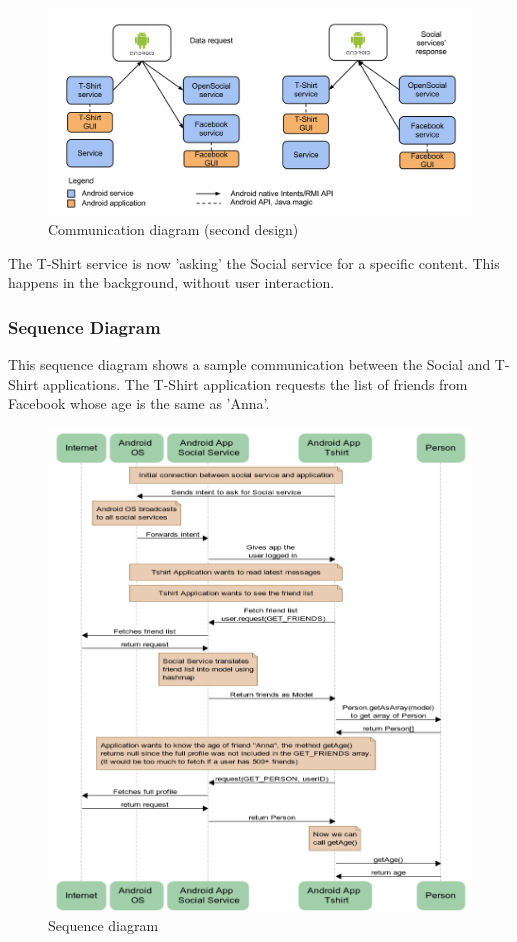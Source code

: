\begin{figure}[h!]
\centering \includegraphics[scale=0.35]{img/design-reqresp.png}
\caption{Communication diagram (second design)}
\label{fig:design-reqresp}
\end{figure}

The T-Shirt service is now 'asking' the Social service for a specific content.
This happens in the background, without user interaction.

\newpage

\subsubsection{Sequence Diagram}
This sequence diagram shows a sample communication between the Social and T-Shirt applications.
The T-Shirt application requests the list of friends from Facebook whose age is the same as 'Anna'.

\begin{figure}[h!]
\centering \includegraphics[width=1.0\textwidth]{img/design-sequence.png}
\caption{Sequence diagram}
\label{fig:design-sequence}
\end{figure}

